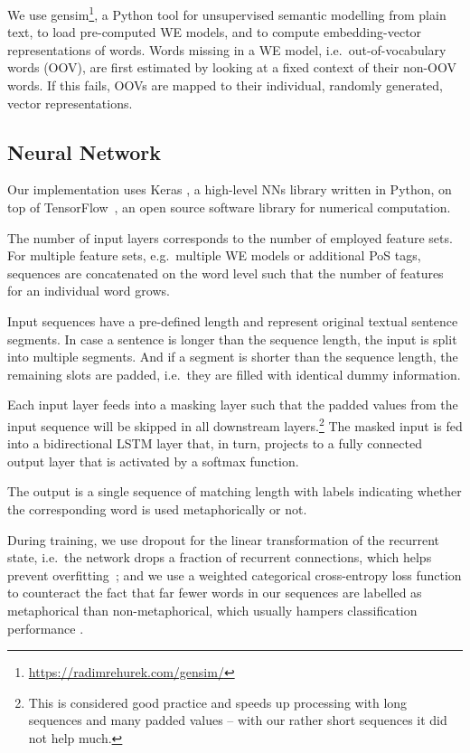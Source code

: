 \documentclass[11pt,a4paper]{article}
\begin{document}
We use gensim\footnote{\url{https://radimrehurek.com/gensim/}}, a Python tool for unsupervised semantic modelling from plain text, to load pre-computed WE models, and to compute embedding-vector representations of words.
Words missing in a WE model, i.e.~out-of-vocabulary words (OOV), are first estimated by looking at a fixed context of their non-OOV words.
If this fails, OOVs are mapped to their individual, randomly generated, vector representations.


\subsection{Neural Network} %

Our implementation uses Keras , a high-level NNs library written in Python, on top of TensorFlow~\cite{tensorflow2016}, an open source software library for numerical computation.

The number of input layers corresponds to the number of employed feature sets. 
For multiple feature sets, e.g.~multiple WE models or additional PoS tags, sequences are concatenated on the word level such that the number of features for an individual word grows.

Input sequences have a pre-defined length and represent original textual sentence segments.
In case a sentence is longer than the sequence length, the input is split into multiple segments. 
And if a segment is shorter than the sequence length, the remaining slots are padded, i.e.~they are filled with identical dummy information.

Each input layer feeds into a masking layer such that the padded values from the input sequence will be skipped in all downstream layers.\footnote{This is considered good practice and speeds up processing with long sequences and many padded values -- with our rather short sequences it did not help much.}
The masked input is fed into a bidirectional LSTM layer that, in turn, projects to a fully connected output layer that is activated by a softmax function.

The output is a single sequence of matching length with labels indicating whether the corresponding word is used metaphorically or not.

During training, we use dropout for the linear transformation of the recurrent state, i.e.~the network drops a fraction of recurrent connections, 
which helps prevent overfitting~\cite{Srivastava2014}; 
and we use a weighted categorical cross-entropy loss function to counteract the fact that far fewer words in our sequences are labelled as metaphorical than non-metaphorical, which usually hampers classification performance \cite[cf.][]{Kotsiantis2006HandlingReview}.
\end{document}

